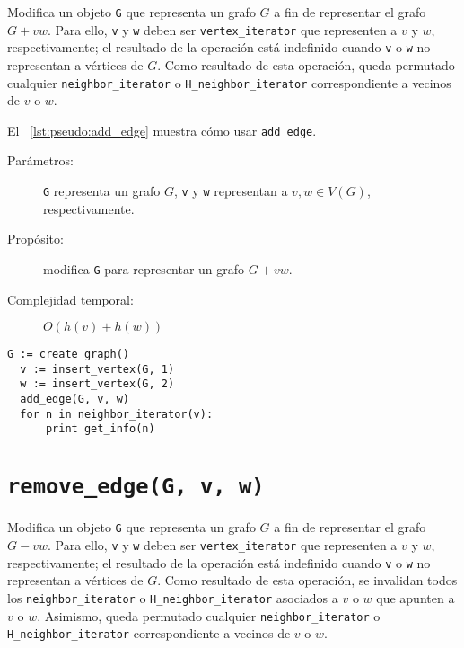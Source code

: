 \documentclass[%
    a4paper,%
    fontsize=12pt,%
    DIV=12,
    twoside,%
    openright,%
    titlepage=true,%
    headsepline,%
    toc=bibliography,%
    parskip=half,%
    cleardoublepage=empty,%
    headings=big,%
]{scrbook}
\makeatletter
\newcommand{\Code}[1]{\lstinline[basicstyle={\ttfamily}]@#1@}
\makeatother
\begin{document}
Modifica un objeto \Code{G} que representa un grafo $G$ a fin de representar el grafo $G + vw$.   Para ello, \Code{v} y \Code{w} deben ser \Code{vertex_iterator} que representen a $v$ y $w$, respectivamente; el resultado de la operación está indefinido cuando \Code{v} o \Code{w} no representan a vértices de $G$.  Como resultado de esta operación, queda permutado cualquier \Code{neighbor_iterator} o \Code{H_neighbor_iterator} correspondiente a vecinos de $v$ o $w$.

El \lstlistingname~\ref{lst:pseudo:add_edge} muestra cómo usar \Code{add_edge}.

\begin{description}
  \item [Parámetros:] \Code{G} representa un grafo $G$, \Code{v} y \Code{w} representan a $v, w \in V(G)$, respectivamente.
  \item [Propósito:] modifica \Code{G} para representar un grafo $G + vw$.
  \item [Complejidad temporal:] $O(h(v) + h(w))$
\end{description}


\begin{lstlisting}[caption={Ejemplo de uso de \Code{add_edge} para imprimir 2. Ver Sección~\ref{sec:tad grafo:neighbor-iterator} para más información de \Code{neghbor_iterator}.},gobble=2,float=ht,label={lst:pseudo:add_edge},emph={add_edge}]
  G := create_graph()
  v := insert_vertex(G, 1)
  w := insert_vertex(G, 2)
  add_edge(G, v, w)
  for n in neighbor_iterator(v):
      print get_info(n)
\end{lstlisting}


\section{\texorpdfstring{\Code{remove_edge(G, v, w)}}{remove\_edge(G, v, w)}}
\label{sec:tad grafo:remove-edge}

Modifica un objeto \Code{G} que representa un grafo $G$ a fin de representar el grafo $G - vw$.  Para ello, \Code{v} y \Code{w} deben ser \Code{vertex_iterator} que representen a $v$ y $w$, respectivamente; el resultado de la operación está indefinido cuando \Code{v} o \Code{w} no representan a vértices de $G$.  Como resultado de esta operación, se invalidan todos los \Code{neighbor_iterator} o \Code{H_neighbor_iterator} asociados a $v$ o $w$ que apunten a $v$ o $w$.  Asimismo, queda permutado cualquier \Code{neighbor_iterator} o \Code{H_neighbor_iterator} correspondiente a vecinos de $v$ o $w$.
\end{document}
